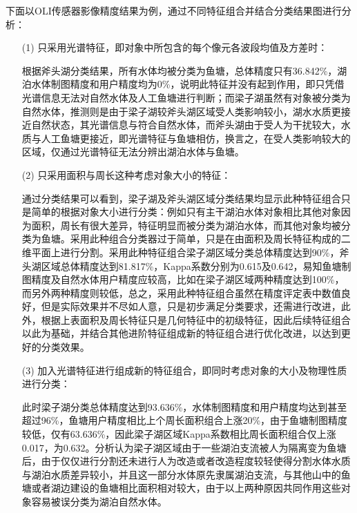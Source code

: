 \documentclass[supercite]{upcthesis}
\begin{document}
下面以OLI传感器影像精度结果为例，通过不同特征组合并结合分类结果图进行分析：
\begin{itemize}
\item[(1)]只采用光谱特征，即对象中所包含的每个像元各波段均值及方差时：

根据斧头湖分类结果，所有水体均被分类为鱼塘，总体精度只有36.842\%，湖泊水体制图精度和用户精度均为0\%，说明此特征并没有起到作用，即只凭借光谱信息无法对自然水体及人工鱼塘进行判断；而梁子湖虽然有对象被分类为自然水体，推测则是由于梁子湖较斧头湖区域受人类影响较小，湖水水质更接近自然状态，其光谱信息与符合自然水体，而斧头湖由于受人为干扰较大，水质与人工鱼塘更接近，即光谱特征与鱼塘相仿，换言之，在受人类影响较大的区域，仅通过光谱特征无法分辨出湖泊水体与鱼塘。
\item[(2)]只采用面积与周长这种考虑对象大小的特征：

通过分类结果可以看到，梁子湖及斧头湖区域分类结果均显示此种特征组合只是简单的根据对象大小进行分类：例如只有主干湖泊水体对象相比其他对象因为面积，周长有很大差异，特征明显而被分类为湖泊水体，而其他对象均被分类为鱼塘。采用此种组合分类器过于简单，只是在由面积及周长特征构成的二维平面上进行分割。采用此种特征组合梁子湖区域分类总体精度达到90\%，斧头湖区域总体精度达到81.817\%，Kappa系数分别为0.615及0.642，易知鱼塘制图精度及自然水体用户精度应较高，比如在梁子湖区域两种精度达到100\%，而另外两种精度则较低，总之，采用此种特征组合虽然在精度评定表中数值良好，但是实际效果并不尽如人意，只是初步满足分类要求，还需进行改进，此外，根据上表面积及周长特征只是几何特征中的初级特征，因此后续特征组合以此为基础，并结合其他进阶特征组成新的特征组合进行优化改进，以达到更好的分类效果。
\item[(3)]加入光谱特征进行组成新的特征组合，即同时考虑对象的大小及物理性质进行分类：

此时梁子湖分类总体精度达到93.636\%，水体制图精度和用户精度均达到甚至超过96\%，鱼塘用户精度相比上个周长面积组合上涨20\%，由于鱼塘制图精度较低，仅有63.636\%，因此梁子湖区域Kappa系数相比周长面积组合仅上涨0.017，为0.632。分析认为梁子湖区域由于一些湖泊支流被人为隔离变为鱼塘后，由于仅仅进行分割还未进行人为改造或者改造程度较轻使得分割水体水质与湖泊水质差异较小，并且这一部分水体原先隶属湖泊支流，与其他山中的鱼塘或者湖边建设的鱼塘相比面积相对较大，由于以上两种原因共同作用这些对象容易被误分类为湖泊自然水体。


\end{itemize}
\end{document}
